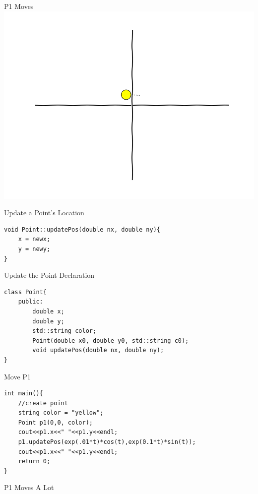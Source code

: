 \documentclass[xcolor={dvipsnames}]{beamer}
\begin{document}
\begin{frame}{P1 Moves}
	\includegraphics[width=1\textwidth]{traj001}
\end{frame}

\begin{frame}[fragile]{Update a Point's Location}
\begin{verbatim}
void Point::updatePos(double nx, double ny){
    x = newx;
    y = newy;
}
\end{verbatim}
\end{frame}

\begin{frame}[fragile]{Update the Point Declaration}
\begin{verbatim}
class Point{
    public:
        double x;
        double y;
        std::string color;
        Point(double x0, double y0, std::string c0);
        void updatePos(double nx, double ny);
}
\end{verbatim}
\end{frame}


\begin{frame}[fragile]{Move P1}
\begin{verbatim}
int main(){
    //create point
    string color = "yellow";
    Point p1(0,0, color);
    cout<<p1.x<<" "<<p1.y<<endl;
    p1.updatePos(exp(.01*t)*cos(t),exp(0.1*t)*sin(t));
    cout<<p1.x<<" "<<p1.y<<endl;
    return 0;
}
\end{verbatim}
\end{frame}

\begin{frame}{P1 Moves A Lot}
	\begin{center}
	\end{center}
\end{frame}
\end{document}
